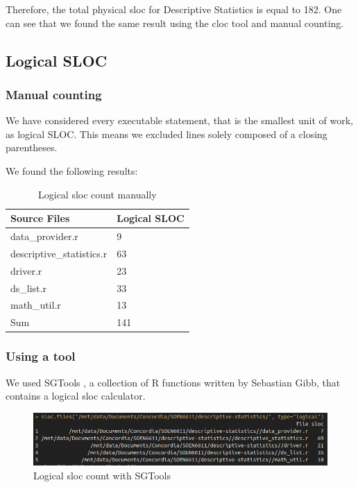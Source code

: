 \documentclass[11pt]{article}
\begin{document}
Therefore, the total physical \gls{sloc} for Descriptive Statistics is equal to 182. One can see that we found the same result using the \gls{cloc} tool and manual counting.

\newpage

\subsection{Logical SLOC}

\subsubsection{Manual counting}

We have considered every executable statement, that is the smallest unit of work, as logical SLOC. This means we excluded lines solely composed of a closing parentheses.

We found the following results:

\begin{table}[ht!]
\centering
\begin{tabular}{|l|l|}
\hline
Source Files              & Logical SLOC  \\ \hline
data\_provider.r          & 9            \\ \hline
descriptive\_statistics.r & 63            \\ \hline
driver.r                  & 23            \\ \hline
ds\_list.r                & 33            \\ \hline
math\_util.r              & 13            \\ \hline
Sum                       & 141           \\ \hline
\end{tabular}
\caption{Logical \gls{sloc} count manually}
\end{table}

\subsubsection{Using a tool}

We used SGTools \cite{sgtools}, a collection of R functions written by Sebastian Gibb, that contains a logical \gls{sloc} calculator.

\begin{figure}[h!]
	\centering
		\includegraphics[width=\textwidth]{logicalsloc.png}
	\caption{Logical \gls{sloc} count with SGTools}
	\label{fig:logicalsloc}
\end{figure}
\end{document}
